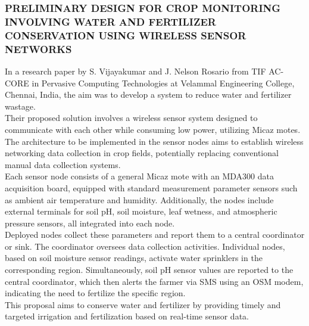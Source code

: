 \documentclass[12pt, a4paper]{article}
\begin{document}
\subsubsection{PRELIMINARY DESIGN FOR CROP MONITORING INVOLVING WATER AND FERTILIZER CONSERVATION USING WIRELESS SENSOR NETWORKS}
In a research paper by S. Vijayakumar and J. Nelson Rosario \cite{vijayakumar2011preliminary} from TIF AC-CORE in Pervasive Computing Technologies at Velammal Engineering College, Chennai, India, the aim was to develop a system to reduce water and fertilizer wastage.\\
Their proposed solution involves a wireless sensor system designed to communicate with each other while consuming low power, utilizing Micaz motes. The architecture to be implemented in the sensor nodes aims to establish wireless networking data collection in crop fields, potentially replacing conventional manual data collection systems.\\
Each sensor node consists of a general Micaz mote with an MDA300 data acquisition board, equipped with standard measurement parameter sensors such as ambient air temperature and humidity. Additionally, the nodes include external terminals for soil pH, soil moisture, leaf wetness, and atmospheric pressure sensors, all integrated into each node.\\
Deployed nodes collect these parameters and report them to a central coordinator or sink. The coordinator oversees data collection activities. Individual nodes, based on soil moisture sensor readings, activate water sprinklers in the corresponding region. Simultaneously, soil pH sensor values are reported to the central coordinator, which then alerts the farmer via SMS using an OSM modem, indicating the need to fertilize the specific region.\\
This proposal aims to conserve water and fertilizer by providing timely and targeted irrigation and fertilization based on real-time sensor data.
\end{document}
